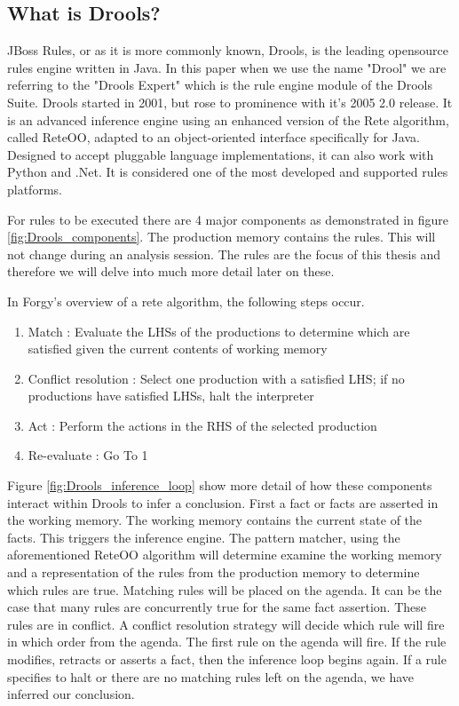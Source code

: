 \subsection{What is Drools?}\label{section:WhatIsDrools}

JBoss Rules, or as it is more commonly known, Drools, is the leading opensource rules engine written in Java.
In this paper when we use the name "Drool" we are referring to the "Drools Expert" which is the rule engine module of the Drools Suite.
Drools started in 2001, but rose to prominence with it's 2005 2.0 release.  
It is an advanced inference engine using an enhanced version of the Rete algorithm, called Rete\-OO\cite{sottara2010configurable}, adapted to an object-oriented interface specifically for Java.
Designed to accept pluggable language implementations, it can also work with Python and .Net.
It is considered one of the most developed and supported rules platforms.

For rules to be executed there are 4 major components as demonstrated in figure \ref{fig:Drools_components}.
The production memory contains the rules.  
This will not change during an analysis session.
The rules are the focus of this thesis and therefore we will delve into much more detail later on these.

In Forgy's\cite{forgy1989rete} overview of a rete algorithm, the following steps occur.
\begin{enumerate}
    \item Match : Evaluate the LHSs of the productions to determine which are satisfied given the current contents of working memory
    \item Conflict resolution : Select one production with a satisfied LHS; if no productions have satisfied LHSs, halt the interpreter
    \item Act : Perform the actions in the RHS of the selected production
    \item Re-evaluate : Go To 1
\end{enumerate}

Figure \ref{fig:Drools_inference_loop} show more detail of how these components interact within Drools to infer a conclusion.
First a fact or facts are asserted in the working memory.
The working memory contains the current state of the facts.
This triggers the inference engine.
The pattern matcher, using the aforementioned Rete\-OO algorithm will determine examine the working memory and a representation of the rules from the production memory to determine which rules are true.
Matching rules will be placed on the agenda.
It can be the case that many rules are concurrently true for the same fact assertion.
These rules are in conflict.
A conflict resolution strategy will decide which rule will fire in which order from the agenda.
The first rule on the agenda will fire.
If the rule modifies, retracts or asserts a fact, then the inference loop begins again.
If a rule specifies to halt or there are no matching rules left on the agenda, we have inferred our conclusion.


